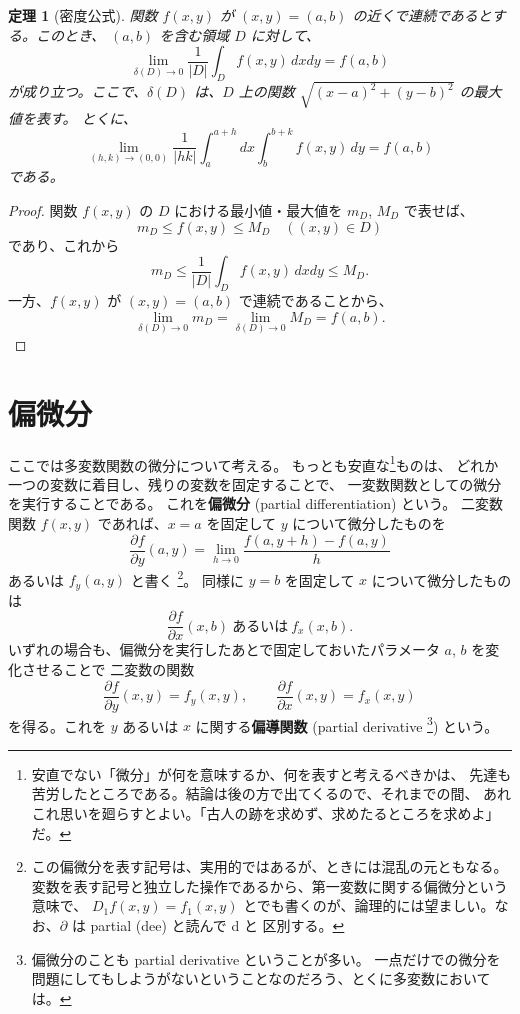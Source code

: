 \documentclass[a4paper]{jsarticle}
\newtheorem{Theorem}{定理}[section]
\theoremstyle{definition}
\theoremstyle{remark}
\begin{document}
\begin{Theorem}[密度公式]\label{density}
関数 $f(x,y)$ が $(x,y) = (a,b)$ の近くで連続であるとする。このとき、
$(a,b)$ を含む領域 $D$ に対して、
\[
\lim_{\delta(D) \to 0} \frac{1}{|D|} \int_D f(x,y)\, dxdy = f(a,b)
\]
が成り立つ。ここで、$\delta(D)$ は、$D$ 上の関数 $\sqrt{(x-a)^2 + (y-b)^2}$ の最大値を表す。
とくに、
\[
\lim_{(h,k) \to (0,0)} \frac{1}{|hk|} \int_a^{a+h}dx \int_b^{b+k} f(x,y)\, dy = f(a,b)
\]
である。
\end{Theorem}

\begin{proof}
関数 $f(x,y)$ の $D$ における最小値・最大値を
$m_D$, $M_D$ で表せば、
\[
m_D \leq f(x,y) \leq M_D\quad ((x,y) \in D) 
\]
であり、これから
\[
m_D \leq \frac{1}{|D|} \int_D f(x,y)\, dxdy \leq M_D. 
\]
一方、$f(x,y)$ が $(x,y) = (a,b)$ で連続であることから、
\[
\lim_{\delta(D) \to 0} m_D = \lim_{\delta(D) \to 0} M_D = f(a,b). 
\]
\end{proof}

\bigskip
\section{偏微分}
ここでは多変数関数の微分について考える。
もっとも安直な\footnote{安直でない「微分」が何を意味するか、何を表すと考えるべきかは、
先達も苦労したところである。結論は後の方で出てくるので、それまでの間、
あれこれ思いを廻らすとよい。「古人の跡を求めず、求めたるところを求めよ」だ。}ものは、
どれか一つの変数に着目し、残りの変数を固定することで、
一変数関数としての微分を実行することである。
これを\textbf{偏微分} (partial differentiation) という。
二変数関数 $f(x,y)$ であれば、$x=a$ を固定して $y$ について微分したものを
\[
\frac{\partial f}{\partial y}(a,y) = \lim_{h \to 0} \frac{f(a,y+h) - f(a,y)}{h} 
\]
あるいは $f_y(a,y)$ と書く
\footnote{この偏微分を表す記号は、実用的ではあるが、ときには混乱の元ともなる。
変数を表す記号と独立した操作であるから、第一変数に関する偏微分という意味で、
$D_1f(x,y) = f_1(x,y)$ とでも書くのが、論理的には望ましい。なお、$\partial$ は partial (dee) と読んで d と
区別する。}。
同様に $y=b$ を固定して $x$ について微分したものは
\[
\frac{\partial f}{\partial x}(x,b) 
\ 
あるいは
\ 
f_x(x,b). 
\]
いずれの場合も、偏微分を実行したあとで固定しておいたパラメータ $a$, $b$ を変化させることで
二変数の関数 
\[
\frac{\partial f}{\partial y}(x,y) = f_y(x,y), 
\qquad 
\frac{\partial f}{\partial x}(x,y) = f_x(x,y)
\]
を得る。これを $y$ あるいは $x$ に関する\textbf{偏導関数} (partial derivative
\footnote{偏微分のことも partial derivative ということが多い。
一点だけでの微分を問題にしてもしようがないということなのだろう、とくに多変数においては。}) という。
\end{document}
